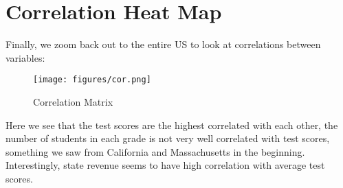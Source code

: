 \documentclass[
]{article}
\begin{document}
\section{Correlation Heat Map}
Finally, we zoom back out to the entire US to look at correlations between variables:
\begin{figure}[!ht]
	\centering
	\texttt{[image: figures/cor.png]}
	\caption{Correlation Matrix}
\end{figure} 
Here we see that the test scores are the highest correlated with each other, the number of students in each grade is not very well correlated with test scores, something we saw from California and Massachusetts in the beginning. Interestingly, state revenue seems to have high correlation with average test scores.
\end{document}
